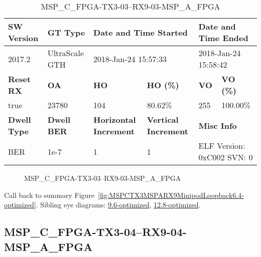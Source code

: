 \begin{table}[h]
\centering
\caption{MSP\_C\_FPGA-TX3-03--RX9-03-MSP\_A\_FPGA}
\label{tab:MSPCFPGATX303RX903MSPAFPGA6.4-optimized}
\begin{tabular}{@{}|l|l|l|l|l|l|@{}}
\toprule
\textbf{SW Version}                & \textbf{GT Type}   & \multicolumn{2}{l|}{\textbf{Date and Time Started}}            & \multicolumn{2}{l|}{\textbf{Date and Time Ended}}        \\ \midrule
2017.2                       & UltraScale GTH          & \multicolumn{2}{l|}{2018-Jan-24 15:57:33}                   & \multicolumn{2}{l|}{2018-Jan-24 15:58:42}               \\ \midrule
\textbf{Reset RX}                  & \textbf{OA} & \textbf{HO}   & \textbf{HO (\%)} & \textbf{VO} & \textbf{VO (\%)} \\ \midrule
true & 23780        & 104          & 80.62\%        & 255        & 100.00\%       \\ \midrule
\textbf{Dwell Type}                & \textbf{Dwell BER} & \textbf{Horizontal Increment} & \textbf{Vertical Increment}    & \multicolumn{2}{l|}{\textbf{Misc Info}}                  \\ \midrule
BER                            & 1e-7        & 1        & 1           & \multicolumn{2}{l|}{ELF Version: 0xC002 SVN: 0}                         \\ \bottomrule
\end{tabular}
\end{table}

\begin{figure}[h]
\caption{MSP\_C\_FPGA-TX3-03--RX9-03-MSP\_A\_FPGA} \label{fig:MSPCFPGATX303RX903MSPAFPGA6.4-optimized}
\end{figure}

Call back to summary Figure~\ref{fig:MSPCTX3MSPARX9MinipodLoopback6.4-optimized}.
Sibling eye diagrams: \hyperref[sec:MSPCFPGATX303RX903MSPAFPGA9.6-optimized]{9.6-optimized}, \hyperref[sec:MSPCFPGATX303RX903MSPAFPGA12.8-optimized]{12.8-optimized}.

\clearpage
\newpage


\subsection{MSP\_C\_FPGA-TX3-04--RX9-04-MSP\_A\_FPGA}\label{sec:MSPCFPGATX304RX904MSPAFPGA6.4-optimized}

